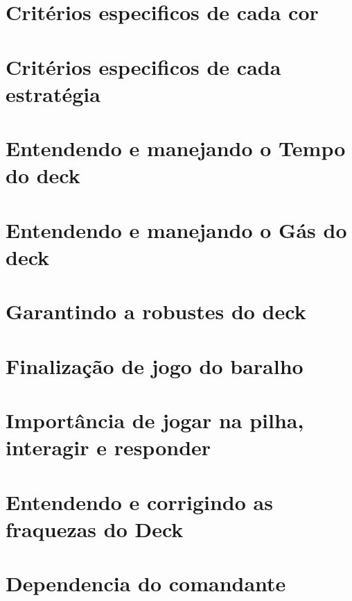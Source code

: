 \documentclass[12pt, a4paper]{article}
\begin{document}
    \section{Critérios especificos de cada cor}
     \pagebreak

    \section{Critérios especificos de cada estratégia}
     \pagebreak

    \section{Entendendo e manejando o Tempo do deck}
     \pagebreak

    \section{Entendendo e manejando o Gás do deck}
     \pagebreak

    \section{Garantindo a robustes do deck}
     \pagebreak

    \section{Finalização de jogo do baralho}
     \pagebreak

    \section{Importância de jogar na pilha, interagir e responder}
     \pagebreak

    \section{Entendendo e corrigindo as fraquezas do Deck}
     \pagebreak

    \section{Dependencia do comandante}
     \pagebreak
\end{document}
